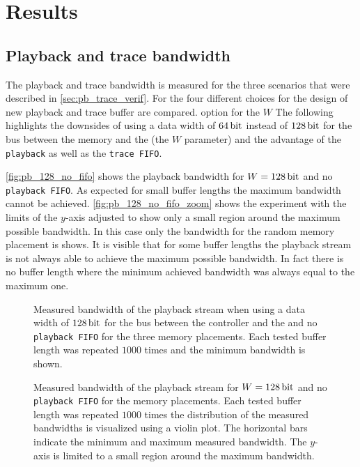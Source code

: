 \section{Results}\label{sec:results}
\subsection{Playback and trace bandwidth}\label{sec:pb_trace_bw}
The playback and trace bandwidth is measured for the three scenarios that were described in \autoref{sec:pb_trace_verif}. For the four different choices for the design of new playback and trace buffer are compared.
option for the $W$
The following highlights the downsides of using a data width of $\PhyWordSize{}$ instead of $\SI{128}{\bit}$ for the \AXI{} bus between the \DDR{} memory and the \AXIDMA{} (the $W$ parameter) and the advantage of the \texttt{playback} as well as the \texttt{trace FIFO}.

\autoref{fig:pb_128_no_fifo} shows the playback bandwidth for $W = \SI{128}{\bit}$ and no \texttt{playback FIFO}. As expected for small buffer lengths the maximum bandwidth cannot be achieved. \autoref{fig:pb_128_no_fifo_zoom} shows the experiment with the limits of the \(y\)-axis adjusted to show only a small region around the maximum possible bandwidth. In this case only the bandwidth for the random memory placement is shows. It is visible that for some buffer lengths the playback stream is not always able to achieve the maximum possible bandwidth. In fact there is no buffer length where the minimum achieved bandwidth was always equal to the maximum one.
\begin{figure}[H]
\caption{Measured bandwidth of the playback stream when using a data width of $\SI{128}{\bit}$ for the \AXI{} bus between the \DDR{} controller and the \AXIDMA{} and no \texttt{playback FIFO} for the three memory placements. Each tested buffer length was repeated $\num{1000}$ times and the minimum bandwidth is shown.}\label{fig:pb_128_no_fifo}
\end{figure}

\begin{figure}[H]
\caption{Measured bandwidth of the playback stream for $W = \SI{128}{\bit}$ and no \texttt{playback FIFO} for the \random{} memory placements. Each tested buffer length was repeated $\num{1000}$ times the distribution of the measured bandwidths is visualized using a violin plot. The horizontal bars indicate the minimum and maximum measured bandwidth. The \(y\)-axis is limited to a small region around the maximum bandwidth.}\label{fig:pb_128_no_fifo_zoom}
\end{figure}

